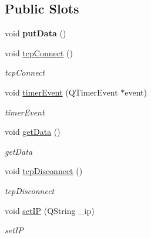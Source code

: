 \subsection*{Public Slots}
\begin{DoxyCompactItemize}
\item 
\mbox{\label{class_main_window_afdfeb13ec363b0eb8ecacaf0aa13b605}} 
void {\bfseries put\+Data} ()
\item 
\mbox{\label{class_main_window_ac5b669957c442b6eb68573dacfce33e1}} 
void \mbox{\hyperlink{class_main_window_ac5b669957c442b6eb68573dacfce33e1}{tcp\+Connect}} ()
\begin{DoxyCompactList}\small\item\em tcp\+Connect \end{DoxyCompactList}\item 
void \mbox{\hyperlink{class_main_window_aaa425b1554af3c1f58cc70b4815082ae}{timer\+Event}} (Q\+Timer\+Event $\ast$event)
\begin{DoxyCompactList}\small\item\em timer\+Event \end{DoxyCompactList}\item 
\mbox{\label{class_main_window_a4a2ddf4cf2ec8e240cc340416b1df792}} 
void \mbox{\hyperlink{class_main_window_a4a2ddf4cf2ec8e240cc340416b1df792}{get\+Data}} ()
\begin{DoxyCompactList}\small\item\em get\+Data \end{DoxyCompactList}\item 
\mbox{\label{class_main_window_a4d22c4c7afc7ba0a2fa4c70515c85dda}} 
void \mbox{\hyperlink{class_main_window_a4d22c4c7afc7ba0a2fa4c70515c85dda}{tcp\+Disconnect}} ()
\begin{DoxyCompactList}\small\item\em tcp\+Disconnect \end{DoxyCompactList}\item 
void \mbox{\hyperlink{class_main_window_a30621e00be29d21bb6e1a7c6f20afc8d}{set\+IP}} (Q\+String \+\_\+ip)
\begin{DoxyCompactList}\small\item\em set\+IP \end{DoxyCompactList}\item 

\end{DoxyCompactItemize}
